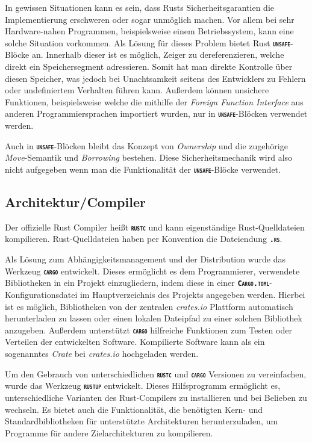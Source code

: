 In gewissen Situationen kann es sein, dass Rusts Sicherheitsgarantien die Implementierung erschweren oder
sogar unmöglich machen. Vor allem bei sehr Hardware-nahen Programmen, beispielsweise einem Betriebssystem,
kann eine solche Situation vorkommen. Als Lösung für dieses Problem bietet Rust
\texttt{\textsc{\textbf{unsafe}}}-Blöcke an. Innerhalb dieser ist es möglich, Zeiger zu dereferenzieren, welche
direkt ein Speichersegment adressieren. Somit hat man direkte Kontrolle über diesen Speicher, was
jedoch bei Unachtsamkeit seitens des Entwicklers zu Fehlern oder undefiniertem Verhalten führen kann.
Außerdem können unsichere Funktionen, beispielsweise welche die mithilfe der
\textit{Foreign Function Interface} aus anderen Programmiersprachen importiert wurden,
nur in \texttt{\textsc{\textbf{unsafe}}}-Blöcken verwendet werden.\cite{rustBook}

Auch in \texttt{\textsc{\textbf{unsafe}}}-Blöcken bleibt das Konzept von \textit{Ownership} und die zugehörige
\textit{Move}-Semantik und \textit{Borrowing} bestehen. Diese Sicherheitsmechanik wird also nicht aufgegeben
wenn man die Funktionalität der \texttt{\textsc{\textbf{unsafe}}}-Blöcke verwendet.\cite{rustBook}

\subsection{Architektur/Compiler}

Der offizielle Rust Compiler heißt \texttt{\textsc{\textbf{rustc}}} und kann eigenständige Rust-Quelldateien
kompilieren. Rust-Quelldateien haben per Konvention die Dateiendung \texttt{\textsc{\textbf{.rs}}}.\cite{rustBook}

Als Lösung zum Abhängigkeitsmanagement und der Distribution wurde das Werkzeug \texttt{\textsc{\textbf{cargo}}} 
entwickelt. Dieses ermöglicht es dem Programmierer, verwendete Bibliotheken in ein Projekt einzugliedern,
indem diese in einer \texttt{\textsc{\textbf{Cargo.toml}}}-Konfigurationsdatei im Hauptverzeichnis
des Projekts angegeben werden. Hierbei ist es möglich, Bibliotheken von der zentralen \textit{crates.io}
Plattform automatisch herunterladen zu lassen oder einen lokalen Dateipfad zu einer solchen
Bibliothek anzugeben.
Außerdem unterstützt \texttt{\textsc{\textbf{cargo}}} hilfreiche Funktionen zum Testen oder
Verteilen der entwickelten Software. Kompilierte Software kann als ein sogenanntes \textit{Crate} bei
\textit{crates.io} hochgeladen werden.\cite{rustBook}

Um den Gebrauch von unterschiedlichen \texttt{\textsc{\textbf{rustc}}} und \texttt{\textsc{\textbf{cargo}}} Versionen 
zu vereinfachen, wurde das Werkzeug \texttt{\textsc{\textbf{rustup}}} entwickelt. Dieses
Hilfsprogramm ermöglicht es, unterschiedliche Varianten des Rust-Compilers zu installieren und bei Belieben zu
wechseln. Es bietet auch die Funktionalität, die benötigten Kern- und Standardbibliotheken für unterstützte
Architekturen herunterzuladen, um Programme für andere Zielarchitekturen zu kompilieren.\cite{rustupRepo}

